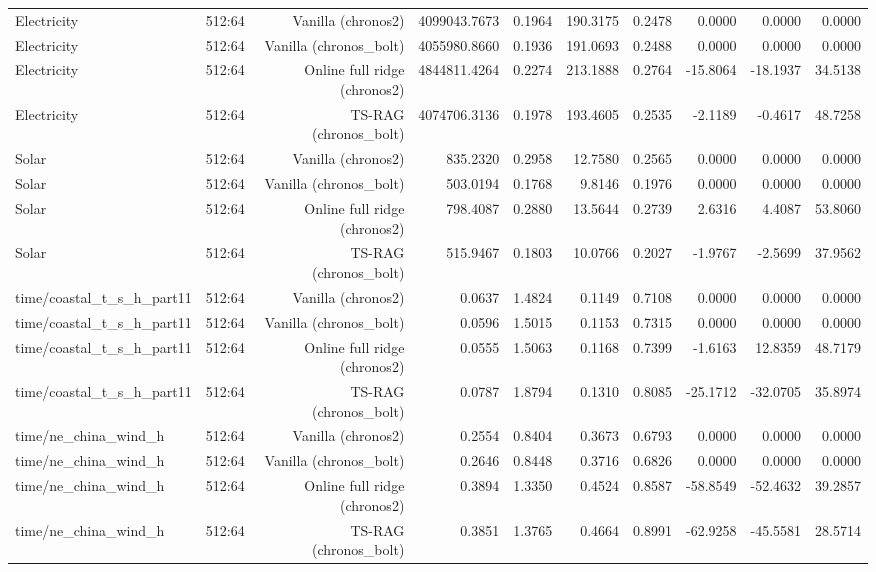 \begin{tabular}{llrrrrrrrr}
Electricity & 512:64 & Vanilla (chronos2) & 4099043.7673 & 0.1964 & 190.3175 & 0.2478 & 0.0000 & 0.0000 & 0.0000 \\
Electricity & 512:64 & Vanilla (chronos\_bolt) & 4055980.8660 & 0.1936 & 191.0693 & 0.2488 & 0.0000 & 0.0000 & 0.0000 \\
Electricity & 512:64 & Online full ridge (chronos2) & 4844811.4264 & 0.2274 & 213.1888 & 0.2764 & -15.8064 & -18.1937 & 34.5138 \\
Electricity & 512:64 & TS-RAG (chronos\_bolt) & 4074706.3136 & 0.1978 & 193.4605 & 0.2535 & -2.1189 & -0.4617 & 48.7258 \\
Solar & 512:64 & Vanilla (chronos2) & 835.2320 & 0.2958 & 12.7580 & 0.2565 & 0.0000 & 0.0000 & 0.0000 \\
Solar & 512:64 & Vanilla (chronos\_bolt) & 503.0194 & 0.1768 & 9.8146 & 0.1976 & 0.0000 & 0.0000 & 0.0000 \\
Solar & 512:64 & Online full ridge (chronos2) & 798.4087 & 0.2880 & 13.5644 & 0.2739 & 2.6316 & 4.4087 & 53.8060 \\
Solar & 512:64 & TS-RAG (chronos\_bolt) & 515.9467 & 0.1803 & 10.0766 & 0.2027 & -1.9767 & -2.5699 & 37.9562 \\
time/coastal\_t\_s\_h\_part11 & 512:64 & Vanilla (chronos2) & 0.0637 & 1.4824 & 0.1149 & 0.7108 & 0.0000 & 0.0000 & 0.0000 \\
time/coastal\_t\_s\_h\_part11 & 512:64 & Vanilla (chronos\_bolt) & 0.0596 & 1.5015 & 0.1153 & 0.7315 & 0.0000 & 0.0000 & 0.0000 \\
time/coastal\_t\_s\_h\_part11 & 512:64 & Online full ridge (chronos2) & 0.0555 & 1.5063 & 0.1168 & 0.7399 & -1.6163 & 12.8359 & 48.7179 \\
time/coastal\_t\_s\_h\_part11 & 512:64 & TS-RAG (chronos\_bolt) & 0.0787 & 1.8794 & 0.1310 & 0.8085 & -25.1712 & -32.0705 & 35.8974 \\
time/ne\_china\_wind\_h & 512:64 & Vanilla (chronos2) & 0.2554 & 0.8404 & 0.3673 & 0.6793 & 0.0000 & 0.0000 & 0.0000 \\
time/ne\_china\_wind\_h & 512:64 & Vanilla (chronos\_bolt) & 0.2646 & 0.8448 & 0.3716 & 0.6826 & 0.0000 & 0.0000 & 0.0000 \\
time/ne\_china\_wind\_h & 512:64 & Online full ridge (chronos2) & 0.3894 & 1.3350 & 0.4524 & 0.8587 & -58.8549 & -52.4632 & 39.2857 \\
time/ne\_china\_wind\_h & 512:64 & TS-RAG (chronos\_bolt) & 0.3851 & 1.3765 & 0.4664 & 0.8991 & -62.9258 & -45.5581 & 28.5714 \\
\bottomrule
\end{tabular}
